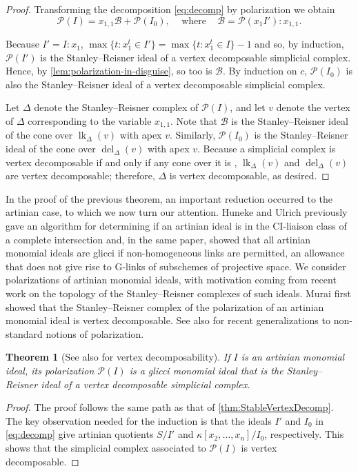 \documentclass[12pt, reqno]{amsart}
\numberwithin{equation}{section}
\newtheorem{theorem}{Theorem}[section]
\newtheorem{Main Conjecture}[theorem]{Main Conjecture}
\theoremstyle{definition}
\theoremstyle{plain}
\newcommand{\B}{\mathcal{B}}
\renewcommand{\P}{\mathcal{P}}
\DeclareMathOperator{\lk}{lk}
\DeclareMathOperator{\del}{del}
\newcommand{\qwhere}{\quad \mbox{where} \quad}
\begin{document}
\begin{proof}
Transforming the decomposition \cref{eq:decomp} by polarization we obtain
\begin{equation}\label{eq:SSVertexDecomp}
\P(I)=x_{1,1}\B+\P(I_0), \, \qwhere \, \B = \P(x_1I'):x_{1,1}.
\end{equation}

Because $I' = I:x_1$, $\max\{t \colon x_1^t \in I'\} = \max\{t \colon x_1^t \in I\}-1$ and so, by induction, $\P(I')$ is the Stanley--Reisner ideal of a vertex decomposable simplicial complex. Hence, by \cref{lem:polarization-in-disguise}, so too is $\B$. By induction on $c$, $\P(I_0)$ is also the Stanley--Reisner ideal of a vertex decomposable simplicial complex. 

Let $\Delta$ denote the Stanley--Reisner complex of $\P(I)$, and let $v$ denote the vertex of $\Delta$ corresponding to the variable $x_{1,1}$. Note that $\B$ is the Stanley--Reisner ideal of the cone over $\lk_{\Delta}(v)$ with apex $v$. Similarly, $\P(I_0)$ is the Stanley--Reisner ideal of the cone over $\del_{\Delta}(v)$ with apex $v$. Because a simplicial complex is vertex decomposable if and only if any cone over it is \cite[Proposition 2.4]{PB80}, $\lk_\Delta(v)$ and $\del_\Delta(v)$ are vertex decomposable; therefore, $\Delta$ is vertex decomposable, as desired.
 \end{proof}



In the proof of the previous theorem, an important reduction occurred to the artinian case, to which we now turn our attention.  Huneke and Ulrich \cite{HU07} previously gave an algorithm for determining if an artinian ideal is in the CI-liaison class of a complete intersection and, in the same paper, showed that all artinian monomial ideals are glicci if non-homogeneous links are permitted, an allowance that does not give rise to G-links of subschemes of projective space. We consider polarizations of artinian monomial ideals, with motivation coming from recent work on the topology of the Stanley--Reisner complexes of such ideals.  Murai \cite[Remark 1.8]{M2011} first showed that the Stanley--Reisner complex of the polarization of an artinian monomial ideal is vertex decomposable.  See also \cite{FM22, AFL22, HLSR22} for recent generalizations to non-standard notions of polarization.  

\begin{theorem}[See also \cite{M2011} for vertex decomposability]\label{thm:ArtinianVertexDecomp}
    If $I$ is an artinian monomial ideal, its polarization $\P(I)$ is a glicci monomial ideal that is the Stanley--Reisner ideal of a vertex decomposable simplicial complex. 
\end{theorem}
\begin{proof}
    The proof follows the same path as that of \cref{thm:StableVertexDecomp}. The key observation needed for the induction is that the ideals $I'$ and $I_0$ in \cref{eq:decomp} give artinian quotients $S/I'$ and $\kappa[x_2,\ldots, x_n]/I_0$, respectively. This shows that the simplicial complex associated to $\P(I)$ is vertex decomposable.
    \end{proof}
\end{document}
